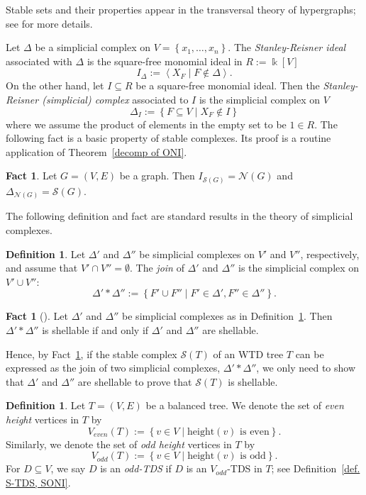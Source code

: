 \documentclass[12pt, reqno]{amsart}
\theoremstyle{definition}
\theoremstyle{plain}
\theoremstyle{definition}
\newtheorem{fact}[theorem]{Fact}
\newtheorem{definition}[theorem]{Definition}
\newcommand{\hh}{\mbox{height}}
\newcommand{\kk}{\Bbbk}
\newcommand\gen[1]{\left\langle #1 \right\rangle}
\newcommand\Set[2]{\left\lbrace #1 \mid #2 \right\rbrace}
\newcommand\set[1]{\left\lbrace #1 \right\rbrace}
\newcommand{\NN}{\mathcal{N}}
\newcommand{\calS}{\mathcal{S}}
\begin{document}
Stable sets and their properties appear in the transversal theory of hypergraphs; see \cite{hypergraphs_B} for more details.

Let $\Delta$ be a simplicial complex on $V = \set{x_1,\dots,x_n}$.
The \emph{Stanley-Reisner ideal} associated with $\Delta$ is the square-free monomial ideal in $R := \kk[V]$
$$
I_\Delta := \gen{X_F \mid F \not\in \Delta}.
$$
On the other hand, let $I \subseteq R$ be a square-free monomial ideal.
Then the \emph{Stanley-Reisner (simplicial) complex} associated to $I$ is the simplicial complex on $V$
$$
\Delta_{I} := \Set{F \subseteq V}{X_F \not\in I}
$$
where we assume the product of elements in the empty set to be $1 \in R$.
The following fact is a basic property of stable complexes. 
Its proof is a routine application of Theorem~\ref{decomp of ONI}.

\begin{fact}\label{fact. SRI of RC is ONI}
Let $G = (V,E)$ be a graph.
Then $I_{\calS(G)} = \NN(G)$ and $\Delta_{\NN(G)} = \calS(G)$.
\end{fact}

The following definition and fact are standard results in the theory of simplicial complexes.

\begin{definition}\label{def. join of simp comp}
    Let $\Delta'$ and $\Delta''$ be simplicial complexes on $V'$ and $V''$, respectively, and assume that $V' \cap V'' = \emptyset$.
    The \emph{join} of $\Delta'$ and $\Delta''$ is the simplicial complex on $V' \cup V''$:
    $$
    \Delta' * \Delta'' := \Set{F' \cup F''}{F' \in \Delta',F'' \in \Delta''}.
    $$
\end{definition}

\begin{fact}[]\label{fact. D'*D'' is shell <->  D',D'' are shell}
    Let $\Delta'$ and $\Delta''$ be simplicial complexes as in Definition~\ref{def. join of simp comp}.
    Then $\Delta'*\Delta''$ is shellable if and only if $\Delta'$ and $\Delta''$ are shellable.
\end{fact}

Hence, by Fact~\ref{fact. D'*D'' is shell <->  D',D'' are shell}, if the stable complex $\calS(T)$ of an WTD tree $T$ can be expressed as the join of two simplicial complexes, $\Delta' * \Delta''$, we only need to show that $\Delta'$ and $\Delta''$ are shellable to prove that $\calS(T)$ is shellable.

\begin{definition}\label{def. even, odd, odd TD set}
    Let $T = (V,E)$ be a balanced tree.
    We denote the set of \emph{even height} vertices in $T$ by
    $$
    V_{even}(T) := \Set{v \in V}{\hh(v)\mbox{ is even}}.
    $$
    Similarly, we denote the set of \emph{odd height} vertices in $T$ by
    $$
    V_{odd}(T) := \Set{v \in V}{\hh(v)\mbox{ is odd}}.
    $$
    For $D \subseteq V$, we say $D$ is an \emph{odd-TDS} if $D$ is an $V_{odd}$-TDS in $T$; see Definition~\ref{def. S-TDS, SONI}.
\end{definition}
\end{document}
